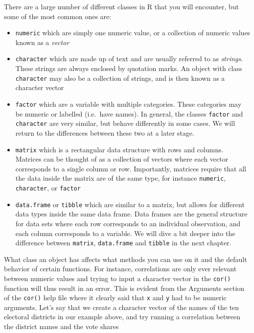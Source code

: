 \documentclass[
]{book}
\providecommand{\tightlist}{%
  \setlength{\itemsep}{0pt}\setlength{\parskip}{0pt}}
\begin{document}
There are a large number of different classes in R that you will encounter, but some of the most common ones are:

\begin{itemize}
\tightlist
\item
  \texttt{numeric} which are simply one numeric value, or a collection of numeric values known as a \emph{vector}
\item
  \texttt{character} which are made up of text and are usually referred to as \emph{strings}. These strings are always enclosed by quotation marks. An object with class \texttt{character} may also be a collection of strings, and is then known as a character vector
\item
  \texttt{factor} which are a variable with multiple categories. These categories may be numeric or labelled (i.e.~have names). In general, the classes \texttt{factor} and \texttt{character} are very similar, but behave differently in some cases. We will return to the differences between these two at a later stage.
\item
  \texttt{matrix} which is a rectangular data structure with rows and columns. Matrices can be thought of as a collection of vectors where each vector corresponds to a single column or row. Importantly, matrices require that all the data inside the matrix are of the same type, for instance \texttt{numeric}, \texttt{character}, or \texttt{factor}
\item
  \texttt{data.frame} or \texttt{tibble} which are similar to a matrix, but allows for different data types inside the same data frame. Data frames are the general structure for data sets where each row corresponds to an individual observation, and each column corresponds to a variable. We will dive a bit deeper into the difference between \texttt{matrix}, \texttt{data.frame} and \texttt{tibble} in the next chapter.
\end{itemize}

What class an object has affects what methods you can use on it and the default behavior of certain functions. For instance, correlations are only ever relevant between numeric values and trying to input a character vector in the \texttt{cor()} function will thus result in an error. This is evident from the Arguments section of the \texttt{cor()} help file where it clearly said that \texttt{x} and \texttt{y} had to be numeric arguments. Let's say that we create a character vector of the names of the ten electoral districts in our example above, and try running a correlation between the district names and the vote shares
\end{document}
